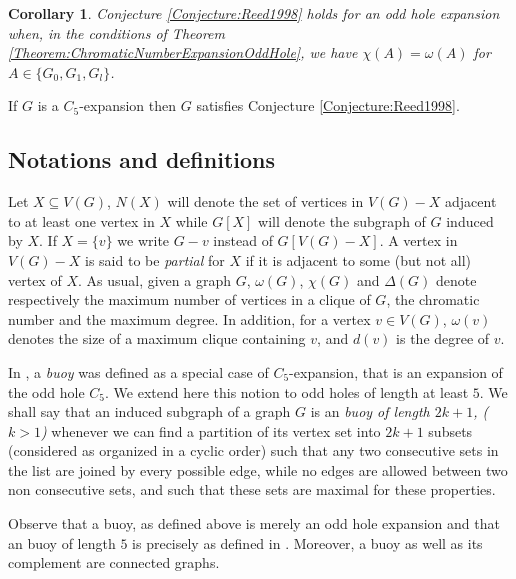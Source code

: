 \documentclass{amsart}
\newtheorem{cor}[thm]{Corollary}
\theoremstyle{definition}
\theoremstyle{remark}
\newcommand{\extB}{buoy\xspace}
\begin{document}
\begin{cor}\cite{FouVan2011} \label{Corollary:ReedsConjecturePourSpecialOddHole}
 Conjecture \ref{Conjecture:Reed1998} holds for an odd hole expansion when,
 in the conditions of Theorem \ref{Theorem:ChromaticNumberExpansionOddHole}, we have $\chi(A)=\omega(A)$ for $A\in \{G_{0},G_{1}, G_{l}\}$.
\end{cor}

\begin{thm} \cite{FouVan2011} \label{Theorem:C5_Expansion} If $G$ is a $C_{5}$-expansion then $G$ satisfies  Conjecture \ref{Conjecture:Reed1998}.
\end{thm}

\subsection{Notations and definitions}
$\;$\\ 
Let $X \subseteq V(G)$, $N(X)$ will denote the set of vertices in $V(G) - X$ adjacent to at least one vertex in $X$ while $G[X]$ will denote the subgraph of $G$ induced by $X$. 
If $X=\{v\}$ we write $G-v$ instead of $G[V(G)-X]$.
A vertex in $V(G)-X$ is said to be {\em partial} for $X$ if it is adjacent to some (but not all) vertex of $X$. 
As usual, given a graph $G$, $\omega(G)$, $\chi(G)$ and $\Delta(G)$ denote respectively the maximum number of vertices in a clique of $G$, the chromatic number and the maximum degree.
In addition, for a vertex $v\in V(G)$, $\omega(v)$ denotes the size of a maximum clique containing $v$, and $d(v)$ is the degree of $v$.



In \cite{FouGiaMaiThu1995}, a {\em buoy} was defined as a special case of $C_5$-expansion, that is an expansion of the odd hole $C_{5}$.
We extend here this notion to odd holes of length at least $5$. We shall say that an induced subgraph of a graph $G$ is an {\em \extB of length $2k+1$, ($k>1$)} 
whenever we can find a partition of its vertex set into $2k+1$ subsets 
(considered as organized in a cyclic order) such that any two consecutive sets  in the list are joined by every
possible edge, while no edges are allowed between two non consecutive sets, and such that these sets are maximal for these properties. 

Observe that a \extB, as defined above is merely an odd hole expansion 
and that an \extB of length $5$ is precisely as defined in \cite{FouGiaMaiThu1995}. Moreover, a \extB as well as its complement are connected graphs.
\end{document}
